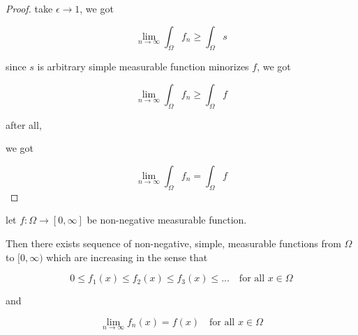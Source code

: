 \begin{proof}
    take $\epsilon \to 1$, we got


    \[
        \lim_{n \to \infty}\int_{\Omega} f_n  \ge \int_{\Omega} s
    \]

    since $s$ is arbitrary simple measurable function minorizes $f$, we got


    \[
        \lim_{n \to \infty}\int_{\Omega} f_n  \ge \int_{\Omega} f
    \]

    after all,

    we got

    \[
        \lim_{n \to \infty}\int_{\Omega} f_n  = \int_{\Omega} f
    \]
\end{proof}

\begin{thm}
    \label{fbb1399e-f592-4e23-be54-aa7b9783005b}
    let $f: \Omega \to [0, \infty]$ be non-negative measurable function.

    Then there exists sequence of non-negative, simple, measurable functions from $\Omega $ to $[0,\infty)$
    which are increasing in the sense that

    \[
        0 \le f_1(x) \le f_2(x) \le f_3(x) \le ... \quad \text{for all } x \in \Omega
    \]

    and

    \[
        \lim_{n \to \infty}f_n(x) = f(x) \quad \text{for all } x \in \Omega
    \]

\end{thm}

